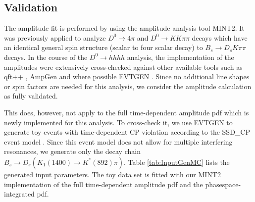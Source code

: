 %

\clearpage
\subsection{Validation}

The amplitude fit is performed by using the amplitude analysis tool \textsf{MINT2}.
It was previously applied to analyze $D^0 \to 4 \pi$ and $D^0 \to KK\pi\pi$ decays \cite{dArgent:2017gzv}
which have an identical general spin structure (\ie scalar to four scalar decay) to $B_s \to D_s K \pi\pi$ decays. 
In the course of the $D^0 \to hhhh$ analysis, the implementation of the amplitudes were extensively cross-checked against 
other available tools such as \textsf{qft++} \cite{Williams:2008wu}, \textsf{AmpGen} \cite{Aaij:2017kbo} and where possible \textsf{EVTGEN} \cite{Lange:2001uf}.
Since no additional line shapes or spin factors are needed for this analysis, we consider the amplitude calculation as fully validated.

This does, however, not apply to the full time-dependent amplitude pdf which is newly implemented for this analysis.
To cross-check it, we use \textsf{EVTGEN} to generate toy events with time-dependent CP violation according to the \textsf{SSD\_CP} event model \cite{Lange:2001uf}.
Since this event model does not allow for multiple interfering resonances, we generate only the decay chain 
$B_s \to D_s \left( K_1(1400) \to K^{*}(892) \pi \right)$. Table \ref{tab:InputGenMC}  lists the generated input parameters.
The toy data set is fitted with our \textsf{MINT2} implementation of the full time-dependent amplitude pdf and the phasespace-integrated pdf.

